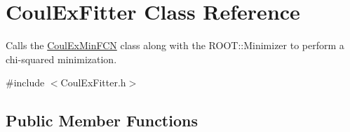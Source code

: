 \hypertarget{classCoulExFitter}{\section{Coul\-Ex\-Fitter Class Reference}
\label{classCoulExFitter}
}


Calls the \hyperlink{classCoulExMinFCN}{Coul\-Ex\-Min\-F\-C\-N} class along with the R\-O\-O\-T\-::\-Minimizer to perform a chi-\/squared minimization.  




{\ttfamily \#include $<$Coul\-Ex\-Fitter.\-h$>$}

\subsection*{Public Member Functions}
